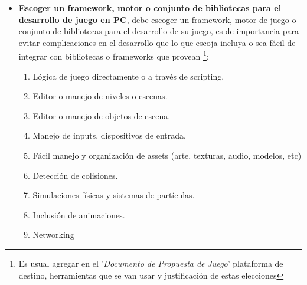\begin{itemize}
\item \textbf{Escoger un framework, motor o conjunto de bibliotecas para el desarrollo de juego en PC}, debe escoger un framework, motor de juego o conjunto de bibliotecas para el desarrollo de su juego, es de importancia para evitar complicaciones en el desarrollo que lo que escoja incluya o sea fácil de integrar con bibliotecas o frameworks que provean \footnote{Es usual agregar en el '\emph{Documento de Propuesta de Juego}' plataforma de destino, herramientas que se van usar y justificación de estas elecciones}:
\begin{enumerate}
  \item Lógica de juego directamente o a través de scripting.
  \item Editor o manejo de niveles o escenas.
  \item Editor o manejo de objetos de escena.
  \item Manejo de inputs, dispositivos de entrada.
  \item Fácil manejo y organización de assets (arte, texturas, audio, modelos, etc)
  \item Detección de colisiones.
  \item Simulaciones físicas y sistemas de partículas.
  \item Inclusión de animaciones.
  \item Networking
\end{enumerate}
\end{itemize}